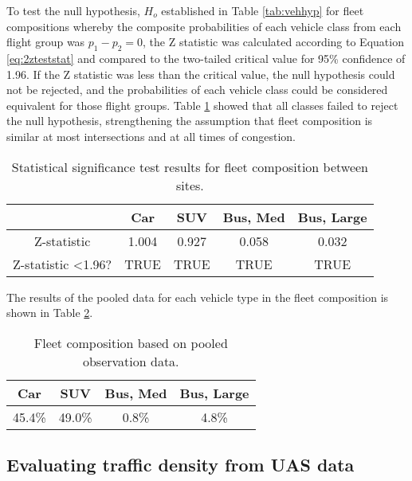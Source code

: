 \documentclass[preprint,12pt,a4paper]{elsarticle}
\begin{document}
\begin{linenumbers}
To test the null hypothesis, $H_{o}$ established in Table \ref{tab:vehhyp} for fleet compositions whereby the composite probabilities of each vehicle class from each flight group was $p_{1} - p_{2} = 0$, the Z statistic was calculated according to Equation \ref{eq:2zteststat} and compared to the two-tailed critical value for 95\% confidence of 1.96. If the Z statistic was less than the critical value, the null hypothesis could not be rejected, and the probabilities of each vehicle class could be considered equivalent for those flight groups. Table \ref{tab:fleettest} showed that all classes failed to reject the null hypothesis, strengthening the assumption that fleet composition is similar at most intersections and at all times of congestion.

\begin{table}[H]
\centering
\caption{Statistical significance test results for fleet composition between sites.}
\label{tab:fleettest}
\begin{tabular}{@{}ccccc@{}}
\toprule
\textbf{} & \textbf{Car} & \textbf{SUV} & \textbf{Bus, Med} & \textbf{Bus, Large} \\ \midrule
Z-statistic & 1.004 & 0.927 & 0.058 & 0.032 \\
Z-statistic \textless 1.96? & TRUE & TRUE & TRUE & TRUE \\ \bottomrule
\end{tabular}
\end{table}

The results of the pooled data for each vehicle type in the fleet composition is shown in Table \ref{tab:pooledfleet}.

\begin{table}[H]
\centering
\caption{Fleet composition based on pooled observation data.}
\label{tab:pooledfleet}
\begin{tabular}{cccc}
\toprule
\textbf{Car} & \textbf{SUV} & \textbf{Bus, Med} & \textbf{Bus, Large} \\ \midrule
45.4\% & 49.0\% & 0.8\% & 4.8\%\\ \bottomrule
\end{tabular}
\end{table}

\subsection{Evaluating traffic density from UAS data}


\end{linenumbers}
\end{document}
